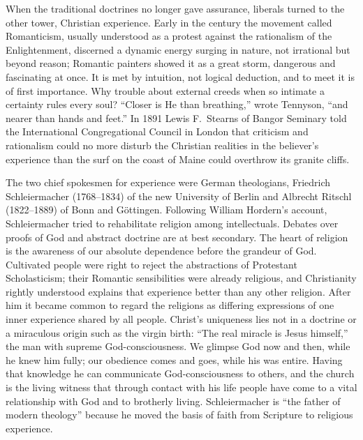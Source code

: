 When the traditional doctrines no longer gave assurance, liberals turned to the other tower,
Christian experience. Early in the century the movement called Romanticism, usually understood as a
protest against the rationalism of the Enlightenment, discerned a dynamic energy surging in nature,
not irrational but beyond reason; Romantic painters showed it as a great storm, dangerous and
fascinating at once. It is met by intuition, not logical deduction, and to meet it is of first
importance. Why trouble about external creeds when so intimate a certainty rules every soul?
``Closer is He than breathing,'' wrote Tennyson, ``and nearer than hands and feet.'' In 1891 Lewis
F.~Stearns of Bangor Seminary told the International Congregational Council in London that criticism
and rationalism could no more disturb the Christian realities in the believer's experience than the
surf on the coast of Maine could overthrow its granite cliffs.

The two chief spokesmen for experience were German theologians, Friedrich Schleiermacher
(1768--1834) of the new University of Berlin and Albrecht Ritschl (1822--1889) of Bonn and
G\"ottingen. Following William Hordern's account, Schleiermacher tried to rehabilitate religion among
intellectuals. Debates over proofs of God and abstract doctrine are at best secondary. The heart of
religion is the awareness of our absolute dependence before the grandeur of God. Cultivated people
were right to reject the abstractions of Protestant Scholasticism; their Romantic sensibilities were
already religious, and Christianity rightly understood explains that experience better than any
other religion. After him it became common to regard the religions as differing expressions of one
inner experience shared by all people. Christ's uniqueness lies not in a doctrine or a miraculous
origin such as the virgin birth: ``The real miracle is Jesus himself,'' the man with supreme
God-consciousness. We glimpse God now and then, while he knew him fully; our obedience comes and goes, while his was entire. Having that knowledge he can communicate God-consciousness to others, and the
church is the living witness that through contact with his life people have come to a vital
relationship with God and to brotherly living. Schleiermacher is ``the father of modern theology''
because he moved the basis of faith from Scripture to religious experience.

